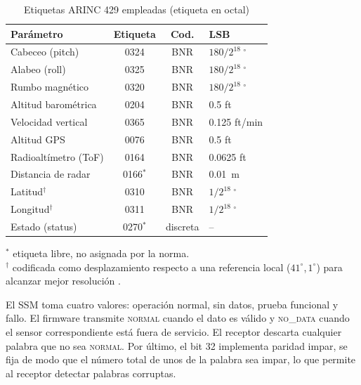 \begin{table}[H]
    \centering
    \caption{Etiquetas ARINC 429 empleadas (etiqueta en octal)}
    \label{tab:arinc_labels}
    \footnotesize
    \begin{tabularx}{\linewidth}{X c c l}
        \toprule
        \textbf{Parámetro} & \textbf{Etiqueta} & \textbf{Cod.} & \textbf{LSB} \\
        \midrule
        Cabeceo (pitch)        & 0324  & BNR & $180/2^{18}\ {}^{\circ}$ \\
        Alabeo (roll)          & 0325  & BNR & $180/2^{18}\ {}^{\circ}$ \\
        Rumbo magnético        & 0320  & BNR & $180/2^{18}\ {}^{\circ}$ \\
        Altitud barométrica    & 0204  & BNR & \num{0.5} ft \\
        Velocidad vertical     & 0365  & BNR & \num{0.125} ft/min \\
        Altitud GPS            & 0076  & BNR & \num{0.5} ft \\
        Radioaltímetro (ToF)   & 0164  & BNR & \num{0.0625} ft \\
        Distancia de radar     & 0166$^{*}$ & BNR & \SI{0.01}{\meter} \\
        Latitud$^{\dagger}$    & 0310  & BNR & $1/2^{18}\ {}^{\circ}$ \\
        Longitud$^{\dagger}$   & 0311  & BNR & $1/2^{18}\ {}^{\circ}$ \\
        Estado (status)        & 0270$^{*}$ & discreta & -- \\
        \bottomrule
    \end{tabularx}

    \vspace{2pt}
    {\footnotesize $^{*}$ etiqueta libre, no asignada por la norma.\\
    $^{\dagger}$ codificada como desplazamiento respecto a una referencia local
    ($41^{\circ}$,\,$1^{\circ}$) para alcanzar mejor resolución .}
\end{table}

El SSM toma cuatro valores: operación normal, sin datos, prueba funcional y
fallo. El firmware transmite \textsc{normal} cuando el dato es válido y
\textsc{no\_data} cuando el sensor correspondiente está fuera de servicio. El
receptor descarta cualquier palabra que no sea \textsc{normal}. Por último, el
bit 32 implementa paridad impar, se fija de modo que el número total de unos de
la palabra sea impar, lo que permite al receptor detectar palabras corruptas.

